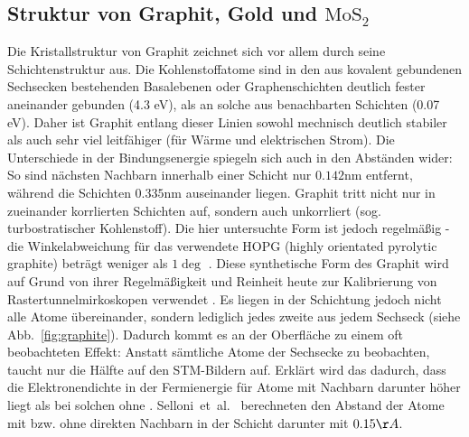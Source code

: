 \subsection{Struktur von Graphit, Gold und $\mathrm{MoS_2}$}
Die Kristallstruktur von Graphit zeichnet sich vor allem durch seine Schichtenstruktur 
aus. Die Kohlenstoffatome sind in den aus kovalent gebundenen Sechsecken bestehenden 
Basalebenen oder Graphenschichten deutlich fester aneinander gebunden (4.3 eV), als 
an solche aus benachbarten Schichten (0.07 eV). Daher ist Graphit entlang dieser Linien 
sowohl mechnisch deutlich stabiler als auch sehr viel leitfähiger (für Wärme und 
elektrischen Strom). Die Unterschiede in der Bindungsenergie spiegeln sich auch in den 
Abständen wider: So sind nächsten Nachbarn innerhalb einer Schicht nur $0.142\mathrm{nm}$ 
entfernt, während die Schichten $0.335\mathrm{nm}$ auseinander liegen.  
Graphit tritt nicht nur in zueinander korrlierten Schichten auf, 
sondern auch unkorrliert (sog. turbostratischer Kohlenstoff). Die hier untersuchte Form 
ist jedoch regelmäßig - die Winkelabweichung für das verwendete HOPG (highly orientated 
pyrolytic graphite) beträgt weniger als $1 \deg$ \cite{mcnaught2000iupac}. Diese 
synthetische Form des Graphit wird auf Grund von ihrer Regelmäßigkeit und Reinheit 
heute zur Kalibrierung von Rastertunnelmirkoskopen verwendet \cite{lapshin1998automatic}. 
Es liegen in 
der Schichtung jedoch nicht alle Atome übereinander, sondern lediglich jedes zweite aus 
jedem Sechseck (siehe Abb.~\ref{fig:graphite}). 
Dadurch kommt es an der Oberfläche zu einem oft beobachteten 
Effekt: Anstatt sämtliche Atome der Sechsecke zu beobachten, taucht nur die Hälfte auf 
den STM-Bildern auf. Erklärt wird das dadurch, dass die Elektronendichte in der 
Fermienergie für Atome mit Nachbarn darunter höher liegt als bei solchen ohne
\cite{zeinalipour2008new}. Selloni~et~al.~\cite{Sellino1985} berechneten den Abstand 
der Atome mit bzw. ohne direkten Nachbarn in der Schicht darunter mit $0.15 \AA$. 

